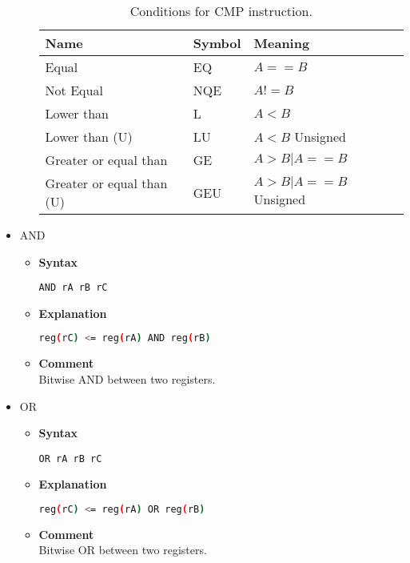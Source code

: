 \begin{itemize}
\begin{itemize}
    \begin{table}[h]
        \centering
        \begin{tabular}{|l|l|l|}
            \hline
            \textbf{Name}             & \textbf{Symbol} & \textbf{Meaning}      \\ \hline
            Equal                     & EQ              & $A==B$                \\ \hline
            Not Equal                 & NQE             & $A!=B$                \\ \hline
            Lower than                & L               & $A<B$                 \\ \hline
            Lower than (U)            & LU              & $A<B$ Unsigned        \\ \hline
            Greater or equal than     & GE              & $A>B | A==B$          \\ \hline
            Greater or equal than (U) & GEU             & $A>B | A==B$ Unsigned \\ \hline
        \end{tabular}
        \caption{Conditions for CMP instruction.}
        \label{tab:cmp_conds}
    \end{table}

    \end{itemize}

    \item AND
    \begin{itemize}
        \item \textbf{Syntax}
        \begin{lstlisting}[language={[x86masm]Assembler}, frame=single]
    AND rA rB rC
        \end{lstlisting}
        \item \textbf{Explanation}
        \begin{lstlisting}[language=bash, frame=single]
    reg(rC) <= reg(rA) AND reg(rB)
        \end{lstlisting}
        \item \textbf{Comment} \\
    Bitwise AND between two registers.
    \end{itemize}

    \item OR
    \begin{itemize}
        \item \textbf{Syntax}
        \begin{lstlisting}[language={[x86masm]Assembler}, frame=single]
    OR rA rB rC
        \end{lstlisting}
        \item \textbf{Explanation}
        \begin{lstlisting}[language=bash, frame=single]
    reg(rC) <= reg(rA) OR reg(rB)
        \end{lstlisting}
        \item \textbf{Comment} \\
    Bitwise OR between two registers.
    \end{itemize}


\end{itemize}
